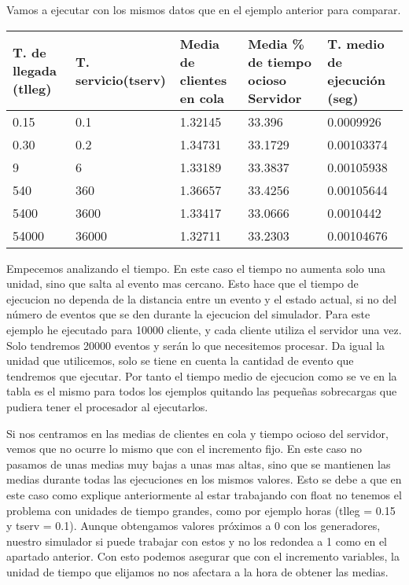 \documentclass[]{article}
\begin{document}
Vamos a ejecutar con los mismos datos que en el ejemplo anterior para comparar.
	\begin{table}[H]
		\begin{center}
			\begin{tabularx}{0.9\textwidth}{|X|X|X|X|X|}
				\hline
				\textbf{T. de llegada (tlleg)} & \textbf{T. servicio(tserv)}&\textbf{Media de clientes en cola} & \textbf{Media \% de tiempo ocioso Servidor} & \textbf{T. medio de ejecución (seg)} \\
				\hline \hline
				0.15 & 0.1 & 1.32145 & 33.396 &0.0009926\\ \hline
				0.30 & 0.2 & 1.34731 & 33.1729 &0.00103374 \\ \hline
				9 & 6& 1.33189 & 33.3837  &0.00105938\\ \hline
				540 & 360 & 1.36657 &33.4256 & 0.00105644 \\ \hline
				5400 & 3600 & 1.33417 & 33.0666 &0.0010442\\ \hline
				54000 & 36000 & 1.32711  & 33.2303 & 0.00104676 \\ \hline
				
			\end{tabularx}
			
		\end{center}
	\end{table}
Empecemos analizando el tiempo. En este caso el tiempo no aumenta solo una unidad, sino que salta al evento mas cercano. Esto hace que el tiempo de ejecucion no dependa de la distancia entre un evento y el estado actual, si no del número de eventos que se den durante la ejecucion del simulador. Para este ejemplo he ejecutado para 10000 cliente, y cada cliente utiliza el servidor una vez. Solo tendremos 20000 eventos y serán lo que necesitemos procesar. Da igual la unidad que utilicemos, solo se tiene en cuenta la cantidad de evento que tendremos que ejecutar. Por tanto el tiempo medio de ejecucion como se ve en la tabla es el mismo para todos los ejemplos quitando las pequeñas sobrecargas que pudiera tener el procesador al ejecutarlos.
\newpage

Si nos centramos en las medias de clientes en cola y tiempo ocioso del servidor, vemos que no ocurre lo mismo que con el incremento fijo. En este caso no pasamos de unas medias muy bajas a unas mas altas, sino que se mantienen las medias durante todas las ejecuciones en los mismos valores. Esto se debe a que en este caso como explique anteriormente al estar trabajando con float no tenemos el problema con unidades de tiempo grandes, como por ejemplo horas (tlleg = 0.15 y tserv = 0.1). Aunque obtengamos valores próximos a 0 con los generadores, nuestro simulador si puede trabajar con estos y no los redondea a 1 como en el apartado anterior. Con esto podemos asegurar que con el incremento variables, la unidad de tiempo que elijamos no nos afectara a la hora de obtener las medias.
\newline
\end{document}
